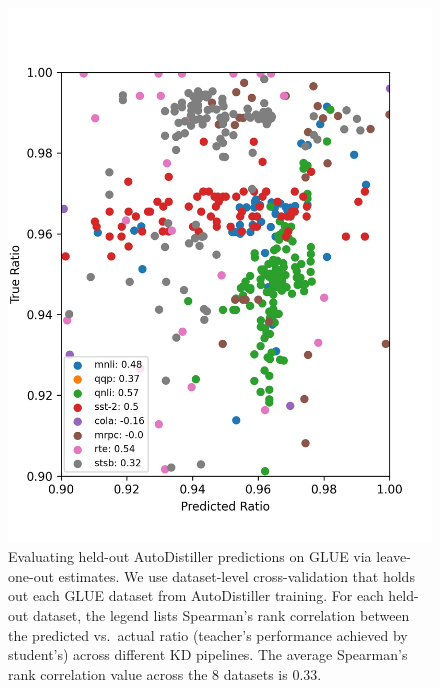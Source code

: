 \documentclass[11pt]{article}
\begin{document}


\begin{figure}[tb!]
    \centering
    \includegraphics[width=0.5\linewidth]{pics/leave_one_out_predictions_100d.jpg}
  \caption{Evaluating held-out AutoDistiller predictions on GLUE via leave-one-out estimates. We use dataset-level cross-validation that holds out each GLUE dataset from AutoDistiller training. For each held-out dataset, the legend lists Spearman's rank correlation between the predicted vs.\ actual ratio (teacher's performance achieved by student's) across different KD pipelines. The average Spearman's rank correlation value across the 8 datasets is 0.33.
  }
  \label{fig:leaveoneout}
\end{figure}
\end{document}
